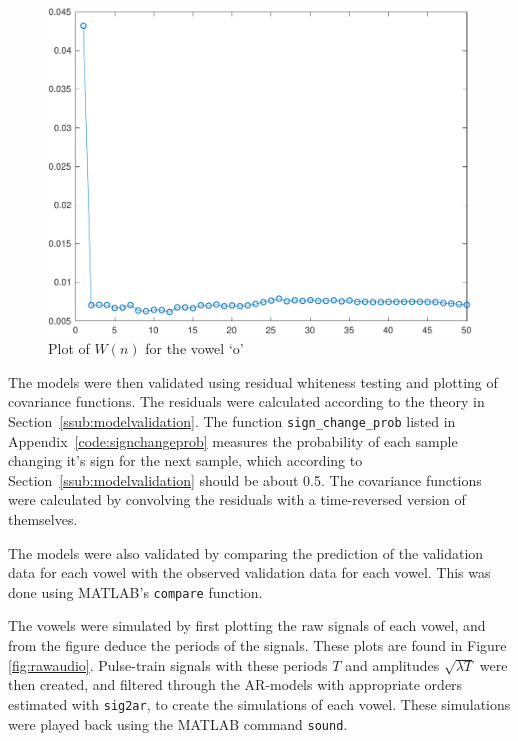 \documentclass{IEEEtran}
\newcommand{\code}[1]{\texttt{#1}}
\begin{document}
\begin{figure}[h!]
    \centering
    \captionsetup{justification=centering}
    \includegraphics[width=0.8\columnwidth]{pictures/wno.pdf}
    \caption{Plot of $W(n)$ for the vowel `o'}
    \label{fig:wno}
\end{figure}

The models were then validated using residual whiteness testing and plotting of
covariance functions. The residuals were calculated according to the theory in
Section~\ref{ssub:modelvalidation}. The function \code{sign\_change\_prob}
listed in Appendix~\ref{code:signchangeprob}
measures the probability of each sample changing it's sign for the next
sample, which according to Section~\ref{ssub:modelvalidation} should be about
0.5. The covariance functions were calculated by convolving the residuals with
a time-reversed version of themselves.

The models were also validated by comparing the prediction of the validation
data for each vowel with the observed validation data for each vowel. This was
done using MATLAB's \code{compare} function.

The vowels were simulated by first plotting the raw signals of each vowel, and
from the figure deduce the periods of the signals. These plots are found in
Figure \ref{fig:rawaudio}. Pulse-train signals with these
periods $T$ and amplitudes $\sqrt{\lambda T}$ were then created,
and filtered through the AR-models with appropriate
orders estimated with \code{sig2ar}, to create the simulations of each vowel.
These simulations were played back using the MATLAB command \code{sound}.
\end{document}
